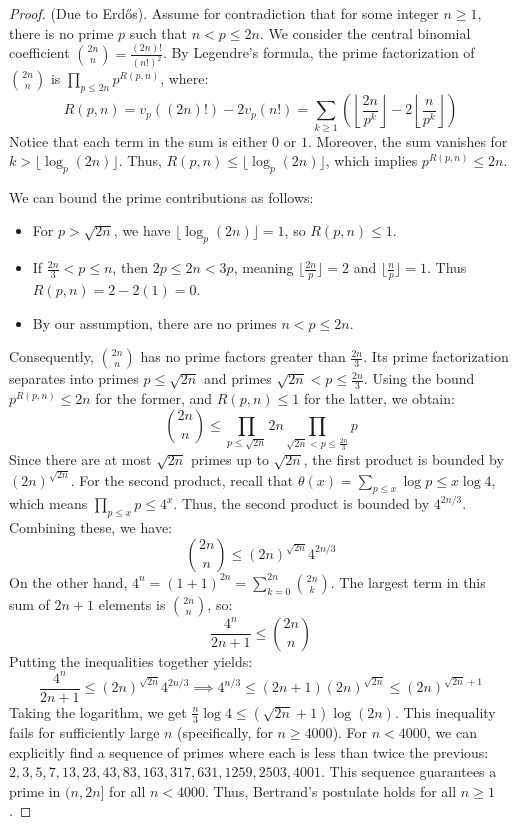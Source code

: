 \documentclass[a4paper]{article}
\begin{document}
\begin{proof}
  (Due to Erd\H{o}s). Assume for contradiction that for some integer
  $n \ge 1$, there is no prime $p$ such that $n < p \le 2n$. We
  consider the central binomial coefficient $\binom{2n}{n} =
  \frac{(2n)!}{(n!)^2}$.
  By Legendre's formula, the prime factorization of $\binom{2n}{n}$
  is $\prod_{p \le 2n} p^{R(p,n)}$, where:
  \[ R(p, n) = v_p((2n)!) - 2v_p(n!) = \sum_{k \ge 1} \left(
      \left\lfloor \frac{2n}{p^k} \right\rfloor - 2\left\lfloor
  \frac{n}{p^k} \right\rfloor \right) \]
  Notice that each term in the sum is either $0$ or $1$. Moreover,
  the sum vanishes for $k > \lfloor \log_p(2n) \rfloor$. Thus, $R(p,
  n) \le \lfloor \log_p(2n) \rfloor$, which implies $p^{R(p,n)} \le 2n$.

  We can bound the prime contributions as follows:
  \begin{itemize}
    \item For $p > \sqrt{2n}$, we have $\lfloor \log_p(2n) \rfloor =
      1$, so $R(p,n) \le 1$.
    \item If $\frac{2n}{3} < p \le n$, then $2p \le 2n < 3p$, meaning
      $\lfloor \frac{2n}{p} \rfloor = 2$ and $\lfloor \frac{n}{p}
      \rfloor = 1$. Thus $R(p,n) = 2 - 2(1) = 0$.
    \item By our assumption, there are no primes $n < p \le 2n$.
  \end{itemize}
  Consequently, $\binom{2n}{n}$ has no prime factors greater than
  $\frac{2n}{3}$. Its prime factorization separates into primes $p
  \le \sqrt{2n}$ and primes $\sqrt{2n} < p \le \frac{2n}{3}$.
  Using the bound $p^{R(p,n)} \le 2n$ for the former, and $R(p,n) \le
  1$ for the latter, we obtain:
  \[ \binom{2n}{n} \le \prod_{p \le \sqrt{2n}} 2n \prod_{\sqrt{2n} <
  p \le \frac{2n}{3}} p \]
  Since there are at most $\sqrt{2n}$ primes up to $\sqrt{2n}$, the
  first product is bounded by $(2n)^{\sqrt{2n}}$.
  For the second product, recall that $\theta(x) = \sum_{p \le x}
  \log p \le x \log 4$, which means $\prod_{p \le x} p \le 4^x$.
  Thus, the second product is bounded by $4^{2n/3}$.
  Combining these, we have:
  \[ \binom{2n}{n} \le (2n)^{\sqrt{2n}} 4^{2n/3} \]
  On the other hand, $4^n = (1+1)^{2n} = \sum_{k=0}^{2n}
  \binom{2n}{k}$. The largest term in this sum of $2n+1$ elements is
  $\binom{2n}{n}$, so:
  \[ \frac{4^n}{2n+1} \le \binom{2n}{n} \]
  Putting the inequalities together yields:
  \[ \frac{4^n}{2n+1} \le (2n)^{\sqrt{2n}} 4^{2n/3} \implies 4^{n/3}
  \le (2n+1)(2n)^{\sqrt{2n}} \le (2n)^{\sqrt{2n}+1} \]
  Taking the logarithm, we get $\frac{n}{3} \log 4 \le (\sqrt{2n}+1)
  \log(2n)$. This inequality fails for sufficiently large $n$
  (specifically, for $n \ge 4000$). For $n < 4000$, we can explicitly
  find a sequence of primes where each is less than twice the
  previous: $2, 3, 5, 7, 13, 23, 43, 83, 163, 317, 631, 1259, 2503,
  4001$. This sequence guarantees a prime in $(n, 2n]$ for all $n <
  4000$. Thus, Bertrand's postulate holds for all $n \ge 1$.
\end{proof}
\end{document}
